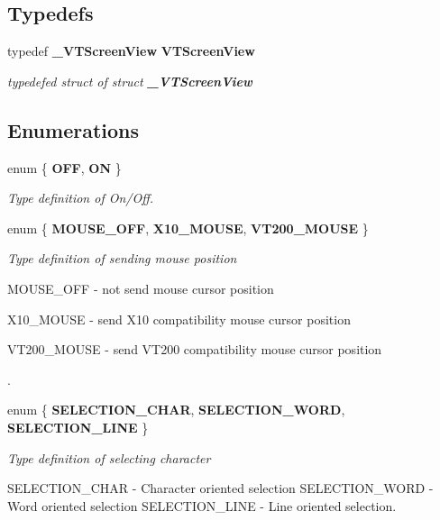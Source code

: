 \subsection*{Typedefs}
\begin{CompactItemize}
\item 
{}
typedef {\bf \_\-VTScreen\-View} {\bf VTScreen\-View}\label{screen_8h_a4}

\begin{CompactList}\small\item\em typedefed struct of struct {\bf \_\-VTScreen\-View}\item\end{CompactList}\end{CompactItemize}
\subsection*{Enumerations}
\begin{CompactItemize}
\item 
enum \{ {\bf OFF}, 
{\bf ON}
 \}
\begin{CompactList}\small\item\em Type definition of On/Off.\item\end{CompactList}\item 
enum \{ {\bf MOUSE\_\-OFF}, 
{\bf X10\_\-MOUSE}, 
{\bf VT200\_\-MOUSE}
 \}
\begin{CompactList}\small\item\em Type definition of sending mouse position \par
 MOUSE\_\-OFF - not send mouse cursor position \par
 X10\_\-MOUSE - send X10 compatibility mouse cursor position \par
 VT200\_\-MOUSE - send VT200 compatibility mouse cursor position \par
.\item\end{CompactList}\item 
enum \{ {\bf SELECTION\_\-CHAR}, 
{\bf SELECTION\_\-WORD}, 
{\bf SELECTION\_\-LINE}
 \}
\begin{CompactList}\small\item\em Type definition of selecting character \par
 SELECTION\_\-CHAR - Character oriented selection SELECTION\_\-WORD - Word oriented selection SELECTION\_\-LINE - Line oriented selection.\item\end{CompactList}\end{CompactItemize}


